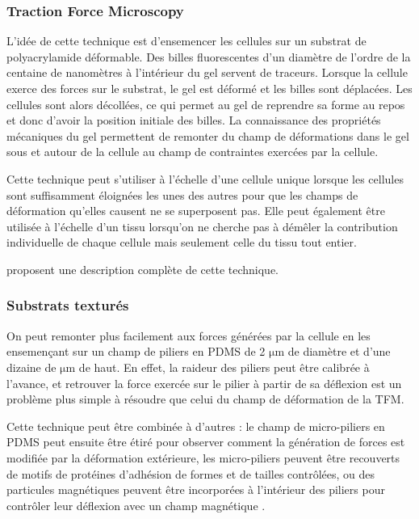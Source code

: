 \documentclass{report}
\newcommand{\micro}{$\mathrm{\mu}$}
\begin{document}
\subsubsection{Traction Force Microscopy}

L'idée de cette technique est d'ensemencer les cellules sur un substrat de polyacrylamide déformable. 
Des billes fluorescentes d'un diamètre de l'ordre de la centaine de nanomètres à l'intérieur du gel servent de traceurs. 
Lorsque la cellule exerce des forces sur le substrat, le gel est déformé et les billes sont déplacées. 
Les cellules sont alors décollées, ce qui permet au gel de reprendre sa forme au repos et donc d'avoir la position initiale des billes. 
La connaissance des propriétés mécaniques du gel permettent de remonter du champ de déformations dans le gel sous et autour de la cellule au champ de contraintes exercées par la cellule. 

Cette technique peut s'utiliser à l'échelle d'une cellule unique lorsque les cellules sont suffisamment éloignées les unes des autres pour que les champs de déformation qu'elles causent ne se superposent pas. 
Elle peut également être utilisée à l'échelle d'un tissu lorsqu'on ne cherche pas à démêler la contribution individuelle de chaque cellule mais seulement celle du tissu tout entier. 

\cite{martiel} proposent une description complète de cette technique. 

\subsubsection{Substrats texturés}

On peut remonter plus facilement aux forces générées par la cellule en les ensemençant sur un champ de piliers en PDMS de 2 \micro m de diamètre et d'une dizaine de \micro m de haut. 
En effet, la raideur des piliers peut être calibrée à l'avance, et retrouver la force exercée sur le pilier à partir de sa déflexion est un problème plus simple à résoudre que celui du champ de déformation de la TFM. 

Cette technique peut être combinée à d'autres : le champ de micro-piliers en PDMS peut ensuite être étiré pour observer comment la génération de forces est modifiée par la déformation extérieure, les micro-piliers peuvent être recouverts de motifs de protéines d'adhésion de formes et de tailles contrôlées, ou des particules magnétiques peuvent être incorporées à l'intérieur des piliers pour contrôler leur déflexion avec un champ magnétique \cite{gupta}. 
\end{document}
